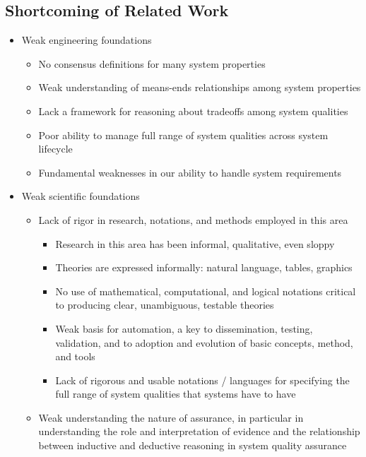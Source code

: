 \documentclass[conference]{IEEEtran}
\begin{document}
\subsection{Shortcoming of Related Work}
\begin{itemize}
\item Weak engineering foundations
	\begin{itemize}
		\item No consensus definitions for many system properties
		\item Weak understanding of means-ends relationships among system properties
		\item Lack a framework for reasoning about tradeoffs among system qualities
		\item Poor ability to manage full range of system qualities across system lifecycle 
		\item	Fundamental weaknesses in our ability to handle system requirements 
	\end{itemize}
	\item	Weak scientific foundations
	\begin{itemize}
		\item Lack of rigor in research, notations, and methods employed in this area
		\begin{itemize}
			\item Research in this area has been informal, qualitative, even sloppy 
			\item	Theories are expressed informally: natural language, tables, graphics
			\item	No use of mathematical, computational, and logical notations critical to producing clear, unambiguous, testable theories
			\item Weak basis for automation, a key to dissemination, testing, validation, and to adoption and evolution of basic concepts, method, and tools
			\item Lack of rigorous and usable notations / languages for specifying the full range of system qualities that systems have to have
		\end{itemize}
		\item	Weak understanding the nature of assurance, in particular in understanding the role and interpretation of evidence and the relationship between inductive and deductive reasoning in system quality assurance
	\end{itemize}
\end{itemize}
\end{document}

